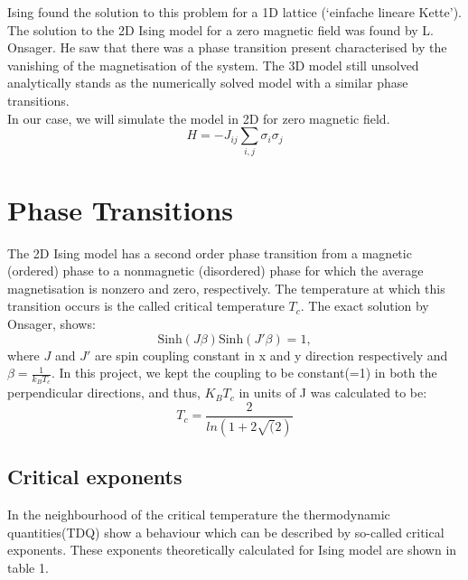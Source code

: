\documentclass[a4paper,8pt]{article}
\begin{document}
\vspace{0.2cm}
\noindent Ising found the solution to this problem for a 1D lattice (‘einfache lineare Kette’). The solution to the 2D Ising model for a zero magnetic field was found by L. Onsager. He saw that
there was a phase transition present characterised by the vanishing of the magnetisation of the system. The 3D model still unsolved analytically stands as the numerically solved model with a similar phase transitions. \\

\noindent In our case, we will simulate the model in 2D for zero magnetic field. \\
\begin{equation}
    H = -J_{ij} \underset{i,j}{\sum} \sigma_{i} \sigma_{j} \label{eq:hamiltonian}
\end{equation}

\section{Phase Transitions}
The 2D Ising model has a second order phase transition from a magnetic (ordered) phase to a nonmagnetic (disordered) phase for which the average magnetisation is nonzero and zero, respectively. The temperature at which this transition occurs is the called critical temperature $T_c$. The exact solution by Onsager, shows:
\begin{equation}
    \mathrm{Sinh} (J \beta) \mathrm{Sinh} (J' \beta) = 1,
\end{equation}
where $J$ and $J'$ are spin coupling constant in x and y direction respectively and $\beta = \frac{1}{k_B T_c}$. In this project, we kept the coupling to be constant(=1) in both the perpendicular directions, and thus, $K_B T_c$ in units of J was calculated to be:
\begin{equation}
    T_c = \frac{2}{ln(1 + 2 \sqrt(2)}
\end{equation}

\subsection{Critical exponents}
In the neighbourhood of the critical temperature the thermodynamic quantities(TDQ) show a behaviour
which can be described by so-called critical exponents\supercite{baxter1982exactly}. These exponents theoretically calculated for Ising model are shown in table 1.
\end{document}
